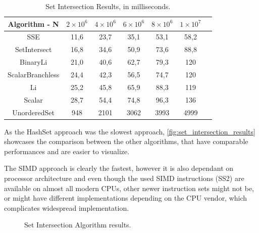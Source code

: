 \begin{table}[!htb]
  \begin{center}
    \caption{Set Intersection Results, in milliseconds.}\label{tab:setresults}
    \begin{tabular}{|c|c|c|c|c|c|c|}
      \hline
      \textbf{Algorithm - N} & \bfseries $2\times10^6$ & \bfseries $4\times10^6$ & \bfseries $6\times10^6$ & \bfseries $8\times10^6$ & \bfseries $1\times10^7$\\
      \hline
      SSE & 11,6 & 23,7 & 35,1 & 53,1 & 58,2 \\
      \hline
      SetIntersect & 16,8 & 34,6 & 50,9 & 73,6 & 88,8 \\
      \hline
      BinaryLi & 21,0 & 40,6 & 62,7 & 79,3 & 120\\
      \hline
      ScalarBranchless & 24,4 & 42,3 & 56,5 & 74,7 & 120\\
      \hline
      Li & 25,2 & 45,8 & 65,9 & 88,3 & 119\\
      \hline
      Scalar & 28,7 & 54,4 & 74,8 & 96,3 & 136 \\
      \hline
      UnorderedSet & 948 & 2101 & 3062 & 3993 & 4999\\
      \hline
    \end{tabular}
  \end{center}
\end{table}

As the HashSet approach was the slowest approach, \autoref{fig:set_intersection_results} showcases the comparison between the other algorithms, that have comparable performances and are easier to visualize.

The SIMD approach is clearly the fastest, however it is also dependant on processor architecture and even though the used SIMD instructions (SS2) are available on almost all modern CPUs, other newer instruction sets might not be, or might have different implementations depending on the CPU vendor, which complicates widespread implementation.

\begin{figure}[H]
  \caption{Set Intersection Algorithm results.}\label{fig:set_intersection_results}
  \vspace{6mm}
  \begin{center}
  \end{center}
  \vspace{2mm}
\end{figure}

